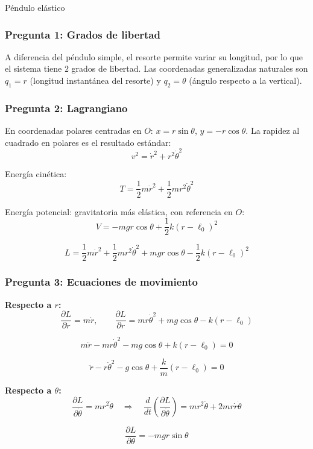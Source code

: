 \begin{solucion}{Péndulo elástico}
\subsubsection*{Pregunta 1: Grados de libertad}

A diferencia del péndulo simple, el resorte permite variar su longitud, por lo que el sistema tiene $2$ grados de libertad. Las coordenadas generalizadas naturales son $q_1 = r$ (longitud instantánea del resorte) y $q_2 = \theta$ (ángulo respecto a la vertical).

\subsubsection*{Pregunta 2: Lagrangiano}

En coordenadas polares centradas en $O$: $x = r\sin\theta$, $y=-r\cos\theta$. La rapidez al cuadrado en polares es el resultado estándar:
$$v^2 = \dot{r}^2 + r^2\dot\theta^2$$

Energía cinética:
$$T = \frac{1}{2}m\dot{r}^2 + \frac{1}{2}mr^2\dot\theta^2$$

Energía potencial: gravitatoria más elástica, con referencia en $O$:
$$V = -mgr\cos\theta + \frac{1}{2}k(r-\ell_0)^2$$

$$\boxed{L = \frac{1}{2}m\dot{r}^2 + \frac{1}{2}mr^2\dot\theta^2 + mgr\cos\theta - \frac{1}{2}k(r-\ell_0)^2}$$

\subsubsection*{Pregunta 3: Ecuaciones de movimiento}

\textbf{Respecto a $r$:}
$$\frac{\partial L}{\partial\dot{r}} = m\dot{r}, \qquad \frac{\partial L}{\partial r} = mr\dot\theta^2 + mg\cos\theta - k(r-\ell_0)$$

$$m\ddot{r} - mr\dot\theta^2 - mg\cos\theta + k(r-\ell_0) = 0$$

$$\boxed{\ddot{r} - r\dot\theta^2 - g\cos\theta + \frac{k}{m}(r-\ell_0) = 0}$$

\textbf{Respecto a $\theta$:}
$$\frac{\partial L}{\partial\dot\theta} = mr^2\dot\theta \quad\Rightarrow\quad \frac{d}{dt}\left(\frac{\partial L}{\partial\dot\theta}\right) = mr^2\ddot\theta + 2mr\dot{r}\dot\theta$$

$$\frac{\partial L}{\partial\theta} = -mgr\sin\theta$$


\end{solucion}
